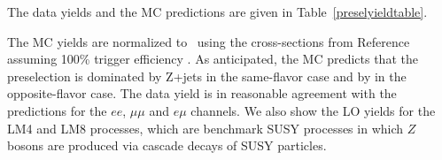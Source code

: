 

The data yields and the MC predictions are given in Table~\ref{preselyieldtable}.

The MC yields are normalized to \lumi\ using the cross-sections
from Reference~\cite{ref:xsec} assuming 100\% trigger efficiency 
.
As anticipated, the MC predicts that the preselection is dominated by Z+jets in the same-flavor 
case and by \ttbar in the opposite-flavor case.  
The data yield is in reasonable agreement with the predictions for the $ee$, $\mu\mu$ and $e\mu$ channels.
We also show the LO 
yields for the LM4 and LM8 processes, which are benchmark
SUSY processes in which $Z$ bosons are produced via cascade decays of SUSY particles. 




